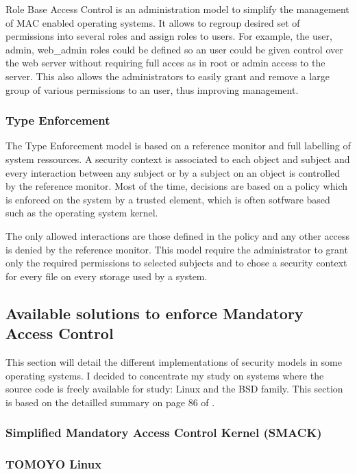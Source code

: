 \documentclass[pdftex,a4paper,titlepage,11pt]{article}
\begin{document}
Role Base Access Control is an administration model to simplify the management
of MAC enabled operating systems. It allows to regroup desired set of
permissions into several roles and assign roles to users. For example, the
user, admin, web\_admin roles could be defined so an user could be given
control over the web server without requiring full acces as in root or admin
access to the server. This also allows the administrators to easily grant and
remove a large group of various permissions to an user, thus improving
management.

\subsubsection{Type Enforcement}

The Type Enforcement model is based on a reference monitor and full labelling
of system ressources. A security context is associated to each object and
subject and every interaction between any subject or by a subject on an object
is controlled by the reference monitor. Most of the time, decisions are based
on a policy which is enforced on the system by a trusted element, which is
often sotfware based such as the operating system kernel.

\bigskip

The only allowed interactions are those defined in the policy and any other
access is denied by the reference monitor. This model require the administrator
to grant only the required permissions to selected subjects and to chose a
security context for every file on every storage used by a system.

\subsection{Available solutions to enforce Mandatory Access Control}

This section will detail the different implementations of security models in
some operating systems. I decided to concentrate my study on systems where the
source code is freely available for study: Linux and the BSD family. This
section is based on the detailled summary on page 86 of
\cite{theseJBriffaut}.

\subsubsection{Simplified Mandatory Access Control Kernel (SMACK)}
\subsubsection{TOMOYO Linux}
\end{document}
